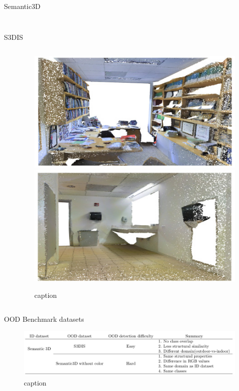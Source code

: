 \documentclass[aspectratio=169]{beamer}
\begin{document}
\begin{frame}{Semantic3D}
\begin{columns}
\begin{column}{0.33\textwidth}
\begin{figure}
            \end{figure}
        \end{column}
    \end{columns}
\end{frame}
\begin{frame}{S3DIS}
    \begin{columns}
        \begin{column}{0.6\textwidth}
            
        \end{column}
        \begin{column}{0.4\textwidth}
            \begin{figure}
                \centering
                \includegraphics[scale=0.35]{images/s3dis/s3dis_sample_1.jpg}
                \includegraphics[scale=0.35]{images/s3dis/s3dis_sample_2.jpg}
                \caption{caption}
                \label{fig:s3dis_sample_images}
            \end{figure}
        \end{column}
    \end{columns}
\end{frame}
\begin{frame}{OOD Benchmark datasets}
    \begin{figure}
        \centering
        \includegraphics[scale=0.33]{images/benchmark_table.jpg}
        \caption{caption}
        \label{fig:benchmark_table}
    \end{figure}
\end{frame}
\end{document}
